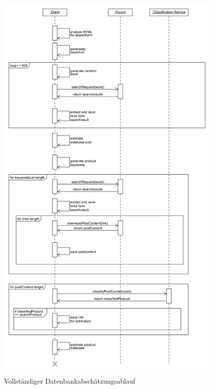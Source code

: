 	\begin{figure}[ht]
		\includegraphics[width=\textwidth,height=\textheight,keepaspectratio]{./diagrams/estimate_seq.png}
		\caption{Vollständiger Datenbankabschätzungsablauf}
	\end{figure}